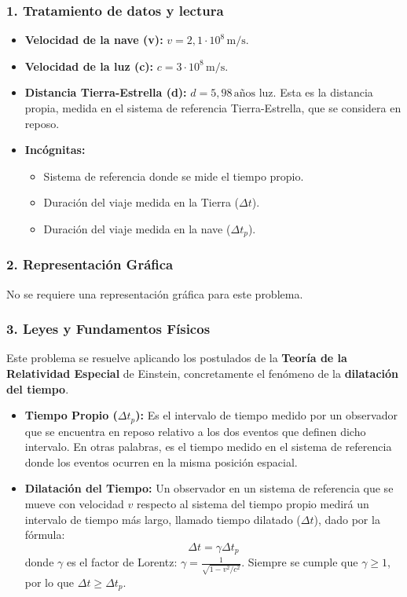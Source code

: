 \subsubsection*{1. Tratamiento de datos y lectura}
\begin{itemize}
    \item \textbf{Velocidad de la nave (v):} $v = 2,1 \cdot 10^8 \, \text{m/s}$.
    \item \textbf{Velocidad de la luz (c):} $c = 3 \cdot 10^8 \, \text{m/s}$.
    \item \textbf{Distancia Tierra-Estrella (d):} $d = 5,98 \, \text{años luz}$. Esta es la distancia propia, medida en el sistema de referencia Tierra-Estrella, que se considera en reposo.
    \item \textbf{Incógnitas:}
    \begin{itemize}
        \item Sistema de referencia donde se mide el tiempo propio.
        \item Duración del viaje medida en la Tierra ($\Delta t$).
        \item Duración del viaje medida en la nave ($\Delta t_p$).
    \end{itemize}
\end{itemize}

\subsubsection*{2. Representación Gráfica}
No se requiere una representación gráfica para este problema.

\subsubsection*{3. Leyes y Fundamentos Físicos}
Este problema se resuelve aplicando los postulados de la \textbf{Teoría de la Relatividad Especial} de Einstein, concretamente el fenómeno de la \textbf{dilatación del tiempo}.
\begin{itemize}
    \item \textbf{Tiempo Propio ($\Delta t_p$):} Es el intervalo de tiempo medido por un observador que se encuentra en reposo relativo a los dos eventos que definen dicho intervalo. En otras palabras, es el tiempo medido en el sistema de referencia donde los eventos ocurren en la misma posición espacial.
    \item \textbf{Dilatación del Tiempo:} Un observador en un sistema de referencia que se mueve con velocidad $v$ respecto al sistema del tiempo propio medirá un intervalo de tiempo más largo, llamado tiempo dilatado ($\Delta t$), dado por la fórmula:
    $$ \Delta t = \gamma \Delta t_p $$
    donde $\gamma$ es el factor de Lorentz: $\gamma = \frac{1}{\sqrt{1-v^2/c^2}}$. Siempre se cumple que $\gamma \ge 1$, por lo que $\Delta t \ge \Delta t_p$.
\end{itemize}

